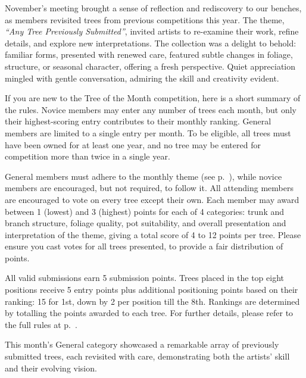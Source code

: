 \label{2025-11-contest}
\noindent
November's meeting brought a sense of reflection and rediscovery to our benches, as members revisited trees from previous competitions this year.
The theme, \textit{``Any Tree Previously Submitted''}, invited artists to re\--examine their work, refine details, and explore new interpretations.
The collection was a delight to behold: familiar forms, presented with renewed care, featured subtle changes in foliage, structure, or seasonal character, offering a fresh perspective.
Quiet appreciation mingled with gentle conversation, admiring the skill and creativity evident.

If you are new to the Tree of the Month competition, here is a short summary of the rules.
Novice members may enter any number of trees each month, but only their highest\--scoring entry contributes to their monthly ranking.
General members are limited to a single entry per month.
To be eligible, all trees must have been owned for at least one year, and no tree may be entered for competition more than twice in a single year.

General members must adhere to the monthly theme (see p.~\pageref{themes}), while novice members are encouraged, but not required, to follow it.
All attending members are encouraged to vote on every tree except their own.
Each member may award between 1 (lowest) and 3 (highest) points for each of 4 categories: trunk and branch structure, foliage quality, pot suitability, and overall presentation and interpretation of the theme, giving a total score of 4 to 12 points per tree.
Please ensure you cast votes for all trees presented, to provide a fair distribution of points.

All valid submissions earn 5 submission points.
Trees placed in the top eight positions receive 5 entry points plus additional positioning points based on their ranking: 15 for 1st, down by 2 per position till the 8th.
Rankings are determined by totalling the points awarded to each tree.
For further details, please refer to the full rules at p.~\pageref{rules}.

\medskip
{}
\noindent
This month's General category showcased a remarkable array of previously submitted trees, each revisited with care, demonstrating both the artists' skill and their evolving vision.

